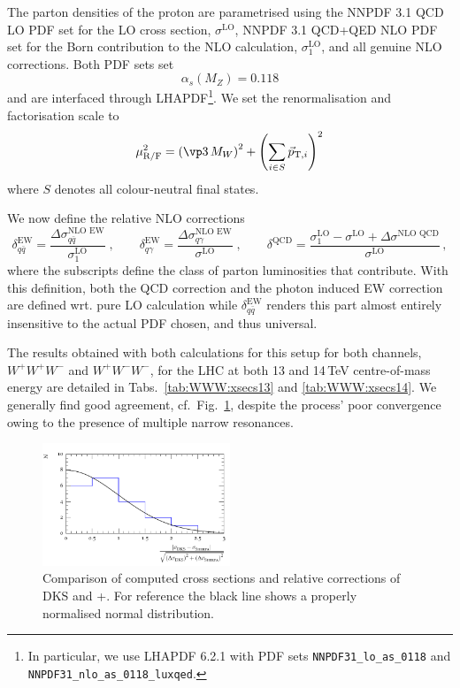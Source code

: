 The parton densities of the proton are parametrised using the 
NNPDF 3.1 QCD LO PDF set \cite{Ball:2017nwa} for the LO cross 
section, $\sigma^\text{LO}$, NNPDF 3.1 QCD+QED NLO PDF set 
\cite{Bertone:2017bme} for the Born contribution to the 
NLO calculation, $\sigma_1^\text{LO}$, and all genuine NLO 
corrections. 
Both PDF sets set
\begin{equation}
  \alpha_s(M_Z)=0.118\nonumber
\end{equation}
and are interfaced through \textsc{LHAPDF}\footnote{
  In particular, we use \textsc{LHAPDF} 6.2.1 with PDF sets 
  \texttt{NNPDF31\_lo\_as\_0118} and 
  \texttt{NNPDF31\_nlo\_as\_0118\_luxqed}.
}. 
We set the renormalisation and factorisation scale to 
\begin{equation}
  \mu_\text{R/F}^2=\left(\vp3\,M_W\right)^2+\left(\sum\limits_{i\in S}\vec{p}_{\mathrm{T},i}\right)^2
\end{equation}
where $S$ denotes all colour-neutral final states.

We now define the relative NLO corrections 
\begin{equation}
  \delta_{q\bar{q}}^\text{EW}
  =\frac{\Delta\sigma_{q\bar{q}}^\text{NLO EW}}{\sigma_1^\text{LO}}
  \;,\qquad
  \delta_{q\gamma}^\text{EW}
  =\frac{\Delta\sigma_{q\gamma}^\text{NLO EW}}{\sigma^\text{LO}}
  \;,\qquad
  \delta^\text{QCD}
  =\frac{\sigma_1^\text{LO}-\sigma^\text{LO}+\Delta\sigma^\text{NLO QCD}}{\sigma^\text{LO}}\,,
\end{equation}
where the subscripts define the class of parton luminosities 
that contribute.
With this definition, both the QCD correction and the photon 
induced EW correction are defined wrt. pure LO calculation 
while $\delta_{q\bar{q}}^\text{EW}$ renders this part almost 
entirely insensitive to the actual PDF chosen, and thus 
universal.


The results obtained with both calculations for this setup 
for both channels, $W^+W^+W^-$ and $W^+W^-W^-$, for the LHC 
at both 13 and 14\,TeV centre-of-mass energy are detailed 
in Tabs.\ \ref{tab:WWW:xsecs13} and \ref{tab:WWW:xsecs14}. 
We generally find good agreement, cf.\ Fig.\ \ref{fig:WWW:xscomp},
despite the process' poor convergence owing to the presence 
of multiple narrow resonances.

\begin{figure}[t!]
  \centering
  \includegraphics[width=0.5\textwidth]{comp-dist}
  \caption{
    Comparison of computed cross sections and relative 
    corrections of DKS and \Sherpa{}+\Recola. 
    For reference the black line 
    shows a properly normalised normal distribution.
    \label{fig:WWW:xscomp}
  }
\end{figure}





